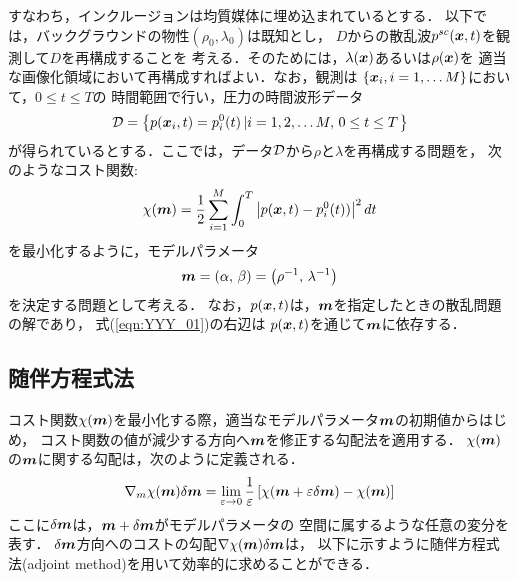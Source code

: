 すなわち，インクルージョンは均質媒体に埋め込まれているとする．
以下では，バックグラウンドの物性$(\rho_0, \lambda_0)$は既知とし，
$D$からの散乱波$p^{sc}(\mbox{\boldmath $x$},t)$を観測して$D$を再構成することを
考える．そのためには，$\lambda(\mbox{\boldmath $x$})$あるいは$\rho(\mbox{\boldmath $x$})$を
適当な画像化領域において再構成すればよい．なお，観測は
$\left\{ \mbox{\boldmath $x$}_i, i=1,\dots M\right\}$において，$0\leq  t\leq T$の
時間範囲で行い，圧力の時間波形データ
\begin{equation}
	{\cal D}
	=
	\left\{ 
		p(\mbox{\boldmath $x$}_i, t)=p_i^{0}(t)\left|
		i=1,2,\dots M, \, 0\leq t \leq T
		\right.
	\right\}
	\label{eqn:YYY_00}
\end{equation}
が得られているとする．ここでは，データ$\cal D$から$\rho$と$\lambda$を再構成する問題を，
次のようなコスト関数:
\begin{equation}
	\chi (\mbox{\boldmath $m$})=\frac{1}{2} 
	\sum_{i=1}^M\int_0^T \left| p(\mbox{\boldmath $x$},t)-p_i^0(t))\right|^2dt
	\label{eqn:YYY_01}
\end{equation}
を最小化するように，モデルパラメータ
\begin{equation}
	\mbox{\boldmath $m$}=(\alpha,\,\beta)=\left( \rho^{-1},\, \lambda^{-1} \right)
	\label{eqn:YYY_02}
\end{equation}
を決定する問題として考える．
なお，$p(\mbox{\boldmath $x$},t)$は，$\mbox{\boldmath $m$}$を指定したときの散乱問題の解であり，
式(\ref{eqn:YYY_01})の右辺は $p(\mbox{\boldmath $x$},t)$を通じて$\mbox{\boldmath $m$}$に依存する．
\subsection{随伴方程式法}
コスト関数$\chi(\mbox{\boldmath $m$})$を最小化する際，適当なモデルパラメータ$\mbox{\boldmath $m$}$の初期値からはじめ，
コスト関数の値が減少する方向へ$\mbox{\boldmath $m$}$を修正する勾配法を適用する．
$\chi(\mbox{\boldmath $m$})$の$\mbox{\boldmath $m$}$に関する勾配は，次のように定義される．
\begin{equation}
	\nabla_m \chi(\mbox{\boldmath $m$}) 
	\delta \mbox{\boldmath $m$}
	= \lim_{\varepsilon \rightarrow 0}
	\frac{1}{\varepsilon}
	\left[
		\chi(\mbox{\boldmath $m$}+\varepsilon \delta \mbox{\boldmath $m$}) - \chi(\mbox{\boldmath $m$})
	\right]
	\label{eqn:YYY_03}
\end{equation}
ここに$\delta \mbox{\boldmath $m$}$は，$\mbox{\boldmath $m$}+\delta \mbox{\boldmath $m$}$がモデルパラメータの
空間に属するような任意の変分を表す．
$\delta\mbox{\boldmath $m$}$方向へのコストの勾配$\nabla \chi (\mbox{\boldmath $m$})\delta \mbox{\boldmath $m$}$は，
以下に示すように随伴方程式法(adjoint method)を用いて効率的に求めることができる．

